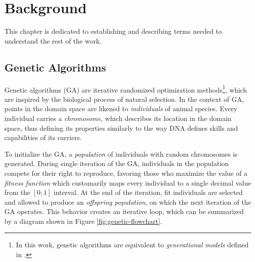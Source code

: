 \chapter{Background}
This chapter is dedicated to establishing and describing terms needed to understand the rest of the work.

\section{Genetic Algorithms}
Genetic algorithms (GA) are iterative randomized optimization methods\footnote{In this work, genetic algorithms are equivalent to \textit{generational models} defined in \cite{AdaptationInSystems}.}, which are inspired by the biological process of natural selection. In the context of GA, points in the domain space are likened to \textit{individuals} of animal species. Every individual carries a \textit{chromosome}, which describes its location in the domain space, thus defining its properties similarly to the way DNA defines skills and capabilities of its carriers.

To initialize the GA, a \textit{population} of individuals with random chromosomes is generated. During single iteration of the GA, individuals in the population compete for their right to reproduce, favoring those who maximize the value of a \textit{fitness function} which customarily maps every individual to a single decimal value from the $[0;1]$ interval. At the end of the iteration, fit individuals are selected and allowed to produce an \textit{offspring population}, on which the next iteration of the GA operates. This behavior creates an iterative loop, which can be summarized by a diagram shown in Figure \ref{fig:genetic-flowchart}.

